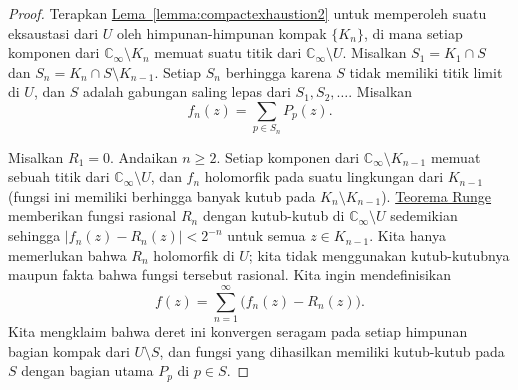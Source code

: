 \documentclass[12pt,openany]{book}
\newcommand{\sabs}[1]{\lvert {#1} \rvert}
\newcommand{\C}{{\mathbb{C}}}
\theoremstyle{plain}
\theoremstyle{remark}
\theoremstyle{definition}
\theoremstyle{exercise}
\theoremstyle{example}
\newcommand{\lemmaref}[1]{\hyperref[#1]{Lema~\ref*{#1}}}
\begin{document}
\begin{proof}
Terapkan \lemmaref{lemma:compactexhaustion2} untuk memperoleh suatu eksaustasi
dari $U$ oleh himpunan-himpunan kompak $\{ K_n \}$,
di mana setiap komponen dari $\C_\infty \setminus K_{n}$
memuat suatu titik dari $\C_\infty \setminus U$.
Misalkan $S_1 = K_1 \cap S$ dan
$S_n = K_n \cap S \setminus K_{n-1}$.
Setiap $S_n$ berhingga karena $S$ tidak memiliki titik limit di $U$,
dan $S$ adalah gabungan saling lepas dari $S_1,S_2,\ldots$.
Misalkan
\begin{equation*}
f_n(z) = \sum_{p \in S_n} P_p(z) .
\end{equation*}

Misalkan $R_1=0$.  Andaikan $n \geq 2$.
Setiap komponen dari $\C_\infty \setminus K_{n-1}$ memuat sebuah titik dari
$\C_\infty \setminus U$, dan $f_n$ holomorfik pada suatu lingkungan dari
$K_{n-1}$ (fungsi ini memiliki berhingga banyak kutub pada $K_n \setminus K_{n-1}$).
\hyperref[cor:rungeseq]{Teorema Runge}
memberikan fungsi rasional $R_n$ dengan kutub-kutub di 
$\C_\infty \setminus U$ sedemikian sehingga $\sabs{f_n(z)-R_n(z)} < 2^{-n}$
untuk semua $z \in K_{n-1}$.  Kita hanya memerlukan bahwa $R_n$ holomorfik di $U$; kita
tidak menggunakan kutub-kutubnya maupun fakta bahwa fungsi tersebut rasional.
Kita ingin mendefinisikan
\begin{equation*}
f(z) = \sum_{n=1}^\infty \bigl( f_n(z) - R_n(z) \bigr) .
\end{equation*}
Kita mengklaim bahwa deret ini konvergen seragam pada setiap himpunan bagian kompak dari $U \setminus S$,
dan fungsi yang dihasilkan memiliki kutub-kutub pada $S$
dengan bagian utama $P_p$ di $p \in S$.


\end{proof}
\end{document}
